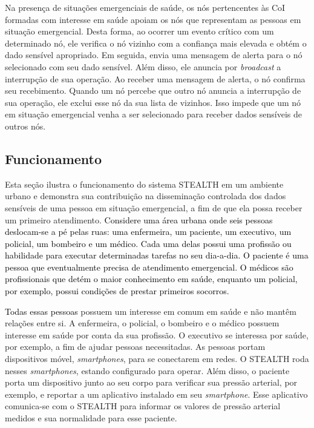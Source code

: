 \documentclass[12pt]{article}
\newcommand{\rev}[1]{\textcolor{black}{{#1}}}
\begin{document}
Na presença de situações emergenciais de saúde, os nós pertencentes às CoI formadas com interesse em saúde apoiam os nós que representam as pessoas em situação emergencial. Desta forma, ao ocorrer um evento crítico com um determinado nó, ele verifica o nó vizinho com a confiança mais elevada e obtém o dado sensível apropriado. Em seguida, envia uma mensagem de alerta para o nó selecionado com seu dado sensível. Além disso, ele anuncia por \textit{broadcast} a interrupção de sua operação. Ao receber uma mensagem de alerta, o nó confirma seu recebimento. Quando um nó percebe que outro nó anuncia a interrupção de sua operação, ele exclui esse nó da sua lista de vizinhos. Isso impede que um nó em situação emergencial venha a ser selecionado para receber dados sensíveis de outros nós. 

\subsection{Funcionamento}

Esta seção ilustra o funcionamento do sistema \mbox{STEALTH} em um ambiente urbano e demonstra sua contribuição na disseminação controlada dos dados sensíveis de uma pessoa em situação emergencial, a fim de que ela possa receber um primeiro atendimento. \rev{Considere uma área urbana onde seis pessoas deslocam-se a pé pelas ruas: uma enfermeira, um paciente, um executivo, um policial, um bombeiro e um médico. Cada uma delas possui uma profissão ou habilidade para executar determinadas tarefas no seu dia-a-dia. O paciente é uma pessoa que eventualmente precisa de atendimento emergencial. O médicos são profissionais que detém o maior conhecimento em saúde, enquanto um policial, por exemplo, possui condições de prestar primeiros socorros.}

\rev{Todas essas pessoas} possuem um interesse em comum em saúde e não mantêm relações entre si. A enfermeira, o policial, o bombeiro e o médico possuem interesse em saúde por conta da sua profissão. O executivo se interessa por saúde, por exemplo, a fim de ajudar pessoas necessitadas. As pessoas portam dispositivos móvel, \textit{smartphones}, para se conectarem em redes. O \mbox{STEALTH} roda nesses \textit{smartphones}, estando configurado para operar. Além disso, o paciente porta um dispositivo junto ao seu corpo para verificar sua pressão arterial, por exemplo, e reportar a um aplicativo instalado em seu \textit{smartphone}. Esse aplicativo comunica-se com o \mbox{STEALTH} para informar os valores de pressão arterial medidos e sua normalidade para esse paciente.
\end{document}
